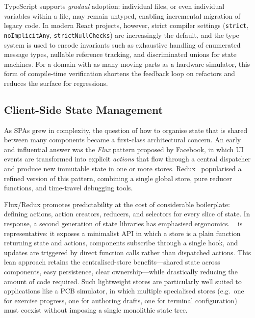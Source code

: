 TypeScript supports \emph{gradual} adoption: individual files, or even individual variables within a file, may remain untyped, enabling incremental migration of legacy code. In modern React projects, however, strict compiler settings (\texttt{strict}, \texttt{noImplicitAny}, \texttt{strictNullChecks}) are increasingly the default, and the type system is used to encode invariants such as exhaustive handling of enumerated message types, nullable reference tracking, and discriminated unions for state machines. For a domain with as many moving parts as a hardware simulator, this form of compile-time verification shortens the feedback loop on refactors and reduces the surface for regressions.

\subsection{Client-Side State Management}\label{subsec:state-management}

As SPAs grew in complexity, the question of how to organise state that is shared between many components became a first-class architectural concern. An early and influential answer was the \emph{Flux} pattern proposed by Facebook, in which UI events are transformed into explicit \emph{actions} that flow through a central dispatcher and produce new immutable state in one or more stores. Redux~\cite{redux} popularised a refined version of this pattern, combining a single global store, pure reducer functions, and time-travel debugging tools.

Flux/Redux promotes predictability at the cost of considerable boilerplate: defining actions, action creators, reducers, and selectors for every slice of state. In response, a second generation of state libraries has emphasised ergonomics. \zustand{}~\cite{zustand} is representative: it exposes a minimalist API in which a store is a plain function returning state and actions, components subscribe through a single hook, and updates are triggered by direct function calls rather than dispatched actions. This lean approach retains the centralised-store benefits---shared state across components, easy persistence, clear ownership---while drastically reducing the amount of code required. Such lightweight stores are particularly well suited to applications like a PCB simulator, in which multiple specialised stores (e.g.\ one for exercise progress, one for authoring drafts, one for terminal configuration) must coexist without imposing a single monolithic state tree.


